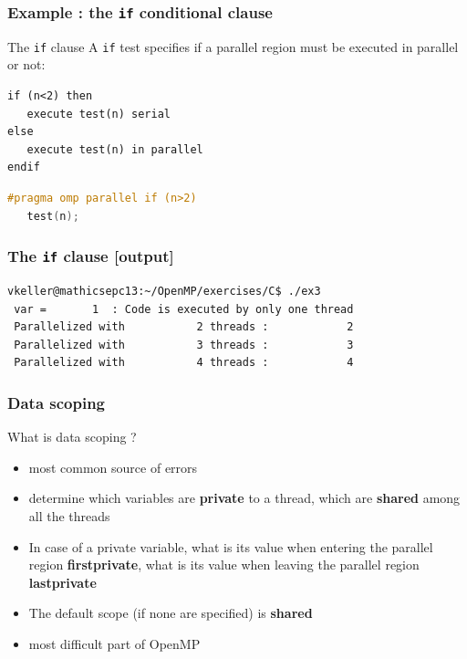 \begin{frame}[fragile]
  \frametitle{Example : the \texttt{if} conditional clause }

  \begin{block}{The \texttt{if} clause}
    A \texttt{if} test specifies if a parallel region must be executed in parallel or not:

\begin{verbatim}
if (n<2) then
   execute test(n) serial
else
   execute test(n) in parallel
endif
\end{verbatim}

  \end{block}

  \begin{lstlisting}[language=C,frame=lines]
#pragma omp parallel if (n>2)
   test(n);
\end{lstlisting}
\end{frame}

\begin{frame}[containsverbatim]
  \frametitle{The \texttt{if} clause [output]}

\begin{verbatim}
vkeller@mathicsepc13:~/OpenMP/exercises/C$ ./ex3
 var =       1  : Code is executed by only one thread
 Parallelized with           2 threads :            2
 Parallelized with           3 threads :            3
 Parallelized with           4 threads :            4
\end{verbatim}

\end{frame}


\begin{frame}[containsverbatim]
  \frametitle{Data scoping}
  What is data scoping ?
  \begin{itemize}
  \item{most common source of errors}
  \item{determine which variables are {\bf private} to a thread, which are {\bf shared} among all the threads}
  \item{In case of a private variable, what is its value when entering the
      parallel region {\bf firstprivate}, what is its value when leaving the
      parallel region {\bf lastprivate}}
  \item The default scope (if none are specified) is \textbf{shared}
  \item{most difficult part of OpenMP}
  \end{itemize}
\end{frame}


